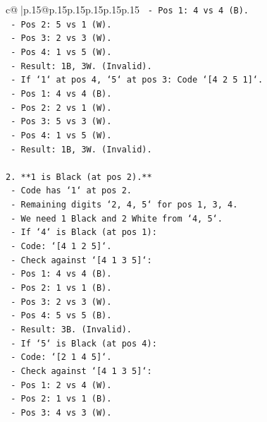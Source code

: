 \documentclass{article}
\begin{document}
{\begin{supertabular}{c@{$\;$}|p{.15\linewidth}@{}p{.15\linewidth}p{.15\linewidth}p{.15\linewidth}p{.15\linewidth}p{.15\linewidth}}
{{{\texttt{            {-} Pos 1: 4 vs 4 (B).} \\
\texttt{            {-} Pos 2: 5 vs 1 (W).} \\
\texttt{            {-} Pos 3: 2 vs 3 (W).} \\
\texttt{            {-} Pos 4: 1 vs 5 (W).} \\
\texttt{            {-} Result: 1B, 3W. (Invalid).} \\
\texttt{        {-} If `1` at pos 4, `5` at pos 3: Code `{[}4 2 5 1{]}`.} \\
\texttt{            {-} Pos 1: 4 vs 4 (B).} \\
\texttt{            {-} Pos 2: 2 vs 1 (W).} \\
\texttt{            {-} Pos 3: 5 vs 3 (W).} \\
\texttt{            {-} Pos 4: 1 vs 5 (W).} \\
\texttt{            {-} Result: 1B, 3W. (Invalid).} \\
\\ 
\texttt{2.  **1 is Black (at pos 2).**} \\
\texttt{    {-} Code has `1` at pos 2.} \\
\texttt{    {-} Remaining digits `2, 4, 5` for pos 1, 3, 4.} \\
\texttt{    {-} We need 1 Black and 2 White from `4, 5`.} \\
\texttt{    {-} If `4` is Black (at pos 1):} \\
\texttt{        {-} Code: `{[}4 1 2 5{]}`.} \\
\texttt{        {-} Check against `{[}4 1 3 5{]}`:} \\
\texttt{            {-} Pos 1: 4 vs 4 (B).} \\
\texttt{            {-} Pos 2: 1 vs 1 (B).} \\
\texttt{            {-} Pos 3: 2 vs 3 (W).} \\
\texttt{            {-} Pos 4: 5 vs 5 (B).} \\
\texttt{            {-} Result: 3B. (Invalid).} \\
\texttt{    {-} If `5` is Black (at pos 4):} \\
\texttt{        {-} Code: `{[}2 1 4 5{]}`.} \\
\texttt{        {-} Check against `{[}4 1 3 5{]}`:} \\
\texttt{            {-} Pos 1: 2 vs 4 (W).} \\
\texttt{            {-} Pos 2: 1 vs 1 (B).} \\
\texttt{            {-} Pos 3: 4 vs 3 (W).} \\
}}}
\end{supertabular}}
\end{document}
